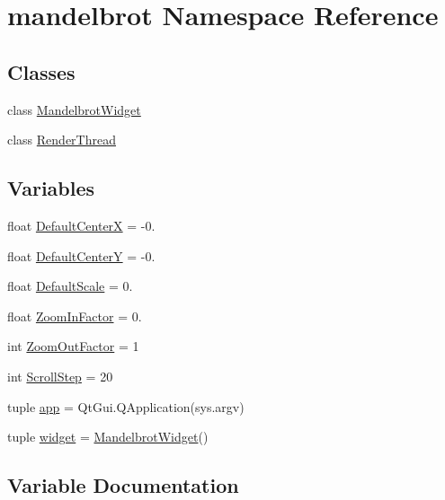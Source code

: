\hypertarget{namespacemandelbrot}{}\section{mandelbrot Namespace Reference}
\label{namespacemandelbrot}
\subsection*{Classes}
\begin{DoxyCompactItemize}
\item 
class \hyperlink{classmandelbrot_1_1MandelbrotWidget}{Mandelbrot\+Widget}
\item 
class \hyperlink{classmandelbrot_1_1RenderThread}{Render\+Thread}
\end{DoxyCompactItemize}
\subsection*{Variables}
\begin{DoxyCompactItemize}
\item 
float \hyperlink{namespacemandelbrot_a3ebdfc03dbff72dc26a6e6c83852d37b}{Default\+Center\+X} = -\/0.
\item 
float \hyperlink{namespacemandelbrot_a29d5e85ee2e76fa638f1023b4740fe67}{Default\+Center\+Y} = -\/0.
\item 
float \hyperlink{namespacemandelbrot_aef2770aab4cfc4659eb64513c439f7b2}{Default\+Scale} = 0.
\item 
float \hyperlink{namespacemandelbrot_afb7f7b076ee5b732b9ec1fe970d5f868}{Zoom\+In\+Factor} = 0.
\item 
int \hyperlink{namespacemandelbrot_a43a62e3fa004745bdf91431cdf394939}{Zoom\+Out\+Factor} = 1
\item 
int \hyperlink{namespacemandelbrot_a76279f2762696c39797b1b526a95b699}{Scroll\+Step} = 20
\item 
tuple \hyperlink{namespacemandelbrot_a6b7d890dd704569ef3c20abbe050fa9a}{app} = Qt\+Gui.\+Q\+Application(sys.\+argv)
\item 
tuple \hyperlink{namespacemandelbrot_af1a0634cd8b41b6157f406a73b59b99c}{widget} = \hyperlink{classmandelbrot_1_1MandelbrotWidget}{Mandelbrot\+Widget}()
\end{DoxyCompactItemize}


\subsection{Variable Documentation}
\hypertarget{namespacemandelbrot_a6b7d890dd704569ef3c20abbe050fa9a}{}

